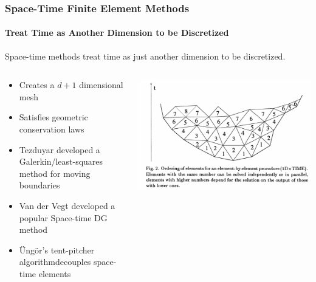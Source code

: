\documentclass[18pt,xcolor=table]{beamer}
\begin{document}
\begin{frame}[t]
\frametitle{Space-Time Finite Element Methods}
\framesubtitle{Treat Time as Another Dimension to be Discretized}
Space-time methods treat time as just another dimension to be discretized.
\begin{columns}[c]
\begin{column}{.7\textwidth}
\begin{itemize}
  \item Creates a $d+1$ dimensional mesh
  \item Satisfies geometric conservation laws\footnotemark
  \item Tezduyar \etal\footnotemark developed a Galerkin/least-squares method for moving boundaries
  \item Van der Vegt \etal developed a popular Space-time DG method\footnotemark
  \item {\"U}ng{\"o}r's tent-pitcher algorithm\footnotemark decouples space-time elements
\end{itemize}
\end{column}
\begin{column}{.3\textwidth}
\includegraphics[width=1.0\textwidth]{Motivation/TentPitcher.png}
\end{column}
\end{columns}
\end{frame}
\end{document}
